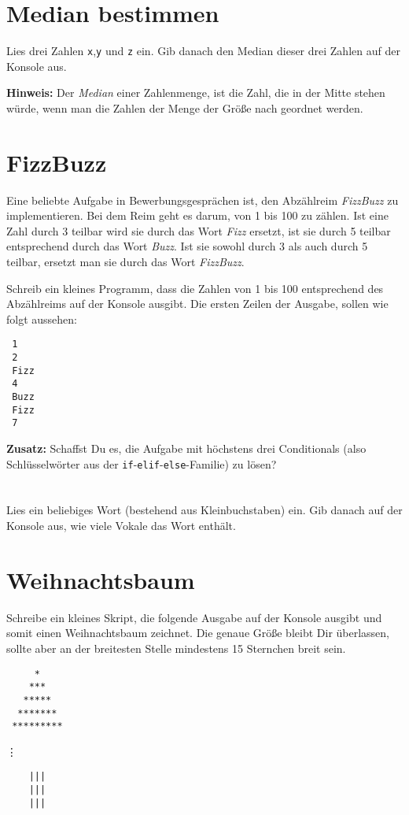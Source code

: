 \documentclass[a4paper]{article}
\begin{document}




\section{Median bestimmen}
Lies drei Zahlen \texttt{x},\texttt{y} und \texttt{z} ein. Gib danach den Median dieser drei Zahlen auf der Konsole aus.

\vspace{2pt}

{\footnotesize \textbf{Hinweis:} Der \emph{Median} einer Zahlenmenge, ist die Zahl, die in der Mitte stehen würde, wenn man die Zahlen der Menge der Größe nach geordnet werden. }


\section{FizzBuzz}
Eine beliebte Aufgabe in Bewerbungsgesprächen ist, den Abzählreim \emph{FizzBuzz} zu implementieren. Bei dem Reim geht es darum, von 1 bis 100 zu zählen. Ist eine Zahl durch 3 teilbar wird sie durch das Wort \emph{Fizz} ersetzt, ist sie durch 5 teilbar entsprechend durch das Wort \emph{Buzz}. Ist sie sowohl durch 3 als auch durch 5 teilbar, ersetzt man sie durch das Wort \emph{FizzBuzz}.

 Schreib ein kleines Programm, dass die Zahlen von 1 bis 100 entsprechend des Abzählreims auf der Konsole ausgibt. Die ersten Zeilen der Ausgabe, sollen wie folgt aussehen: 

\vspace{0.2cm}
\begin{verbatim}
 1
 2
 Fizz
 4
 Buzz
 Fizz
 7
\end{verbatim}
\textbf{Zusatz:} Schaffst Du es, die Aufgabe mit höchstens drei Conditionals (also Schlüsselwörter aus der  \texttt{if}-\texttt{elif}-\texttt{else}-Familie) zu lösen? 

\section{}
Lies ein beliebiges Wort (bestehend aus Kleinbuchstaben) ein. Gib danach auf der Konsole aus, wie viele Vokale das Wort enthält. 

\section{Weihnachtsbaum}
Schreibe ein kleines Skript, die folgende Ausgabe auf der Konsole ausgibt und somit einen Weihnachtsbaum zeichnet. Die genaue Größe bleibt Dir überlassen, sollte aber an der breitesten Stelle mindestens 15 Sternchen breit sein. 

\vspace{0.2cm}

\begin{verbatim}
     *
    ***
   *****
  *******
 *********
\end{verbatim}
\phantom{*****.}\vdots
\begin{verbatim}
    |||
    |||
    |||
\end{verbatim}
\end{document}
